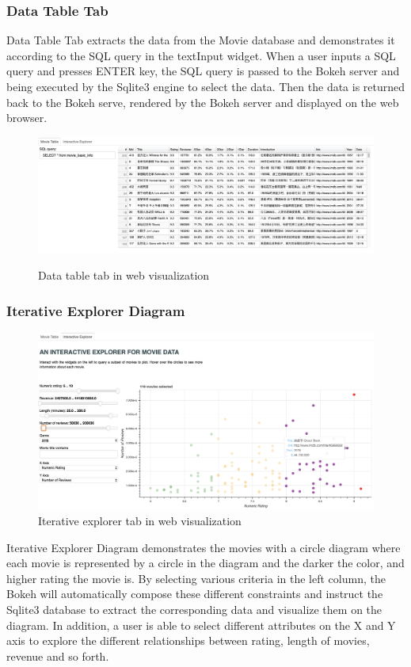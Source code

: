 \documentclass[a4paper]{article}
\begin{document}
\subsubsection{Data Table Tab}
Data Table Tab extracts the data from the Movie database and demonstrates it according to the SQL query in the textInput widget. When a user inputs a SQL query and presses ENTER key, the SQL query is passed to the Bokeh server and being executed by the Sqlite3 engine to select the data. Then the data is returned back to the Bokeh serve, rendered by the Bokeh server and displayed on the web browser.

\begin{figure}[H]
  \centering
  \includegraphics[width=\textwidth]{figures/data_table.png}
  \label{fig:datatable}
  \caption{Data table tab in web visualization}
\end{figure}

\subsubsection{Iterative Explorer Diagram}
\begin{figure}[H]
  \centering
  \includegraphics[width=\textwidth*4/5]{figures/explorer.png}
  \caption{Iterative explorer tab in web visualization}
  \label{fig:iterative_explorer}
\end{figure}
Iterative Explorer Diagram demonstrates the movies with a circle diagram where each movie is represented by a circle in the diagram and the darker the color, and higher rating the movie is. By selecting various criteria in the left column, the Bokeh will automatically compose these different constraints and instruct the Sqlite3 database to extract the corresponding data and visualize them on the diagram. In addition, a user is able to select different attributes on the X and Y axis to explore the different relationships between rating, length of movies, revenue and so forth.
\end{document}

